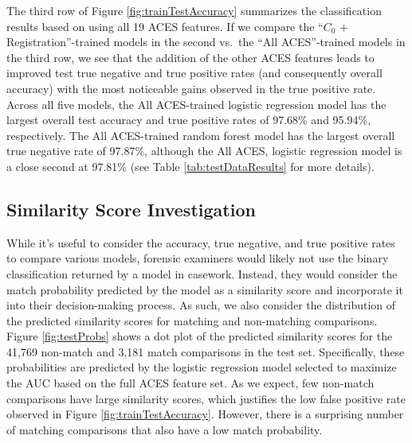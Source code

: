 \documentclass[11pt,]{isuthesis}
\begin{document}
The third row of Figure \ref{fig:trainTestAccuracy} summarizes the classification results based on using all 19 ACES features.
If we compare the ``\(C_0\) + Registration''-trained models in the second vs.~the ``All ACES''-trained models in the third row, we see that the addition of the other ACES features leads to improved test true negative and true positive rates (and consequently overall accuracy) with the most noticeable gains observed in the true positive rate.
Across all five models, the All ACES-trained logistic regression model has the largest overall test accuracy and true positive rates of 97.68\% and 95.94\%, respectively.
The All ACES-trained random forest model has the largest overall true negative rate of 97.87\%, although the All ACES, logistic regression model is a close second at 97.81\% (see Table \ref{tab:testDataResults} for more details).

\hypertarget{similarity-score-investigation}{%
\subsection{Similarity Score Investigation}\label{similarity-score-investigation}}

While it's useful to consider the accuracy, true negative, and true positive rates to compare various models, forensic examiners would likely not use the binary classification returned by a model in casework.
Instead, they would consider the match probability predicted by the model as a similarity score and incorporate it into their decision-making process.
As such, we also consider the distribution of the predicted similarity scores for matching and non-matching comparisons.
Figure \ref{fig:testProbs} shows a dot plot of the predicted similarity scores for the 41,769 non-match and 3,181 match comparisons in the test set.
Specifically, these probabilities are predicted by the logistic regression model selected to maximize the AUC based on the full ACES feature set.
As we expect, few non-match comparisons have large similarity scores, which justifies the low false positive rate observed in Figure \ref{fig:trainTestAccuracy}.
However, there is a surprising number of matching comparisons that also have a low match probability.
\end{document}
